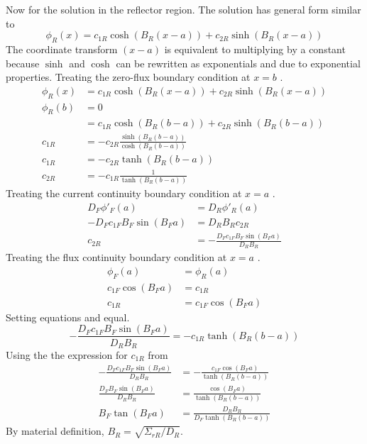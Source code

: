   Now for the solution in the reflector region. The solution has general form
  similar to 
  \begin{equation}
    \phi_R(x) = c_{1R} \cosh(B_R (x-a)) + c_{2R} \sinh(B_R (x-a))
  \end{equation}
  The coordinate transform $(x-a)$ is equivalent to multiplying by a constant 
  because $\sinh$ and $\cosh$ can be rewritten as exponentials and due to 
  exponential properties. Treating the zero-flux boundary condition at $x=b$ 
  .
  \begin{align}
    \phi_R(x) &= c_{1R} \cosh(B_R (x-a)) + c_{2R} \sinh(B_R (x-a))\\
    \phi_R(b) &= 0 \\
    &= c_{1R} \cosh(B_R(b-a)) + c_{2R} \sinh(B_R(b-a))\\
    c_{1R} &= -c_{2R} \frac{\sinh(B_R(b-a))}{\cosh(B_R(b-a))}\\
    c_{1R} &= -c_{2R} \tanh(B_R(b-a))\\
    c_{2R} &= -c_{1R} \frac{1}{\tanh(B_R(b-a))} \label{eq:c2rnumber1}
  \end{align}
  Treating the current continuity boundary condition at $x=a$ 
  .
  \begin{align}
    D_F \phi'_F(a) &= D_R \phi'_R(a) \\
    -D_F c_{1F} B_F \sin(B_F a) &= D_R B_R c_{2R} \\
    c_{2R} &= -\frac{D_F c_{1F} B_F \sin(B_F a)}{D_R B_R} \label{eq:c2rnumber2}
  \end{align}
  Treating the flux continuity boundary condition at $x=a$ 
  .
  \begin{align}
    \phi_F(a)&=\phi_R(a) \\
    c_{1F} \cos(B_F a) &= c_{1R} \\
    c_{1R} &= c_{1F} \cos(B_F a) \label{eq:c1r}
  \end{align}
  Setting equations  and  equal.
  \begin{equation}
    - \frac{D_F c_{1F} B_F \sin(B_F a)}{D_R B_R} = -c_{1R} \tanh(B_R(b-a))
  \end{equation}
  Using the the expression for $c_{1R}$ from 
  \begin{align}
    - \frac{D_F c_{1F} B_F \sin(B_F a)}{D_R B_R} &=
      - \frac{c_{1F} \cos(B_F a)}{\tanh(B_R(b-a))}\\
    \frac{D_F B_F \sin(B_F a)}{D_R B_R} &= 
      \frac{\cos(B_F a)}{\tanh(B_R(b-a))} \\
    B_F \tan(B_F a) &= \frac{D_R B_R}{D_F \tanh(B_R(b-a))}
  \end{align}
  By material definition,  ${B_R = \sqrt{\Sigma_{rR}/D_R}}$.
  
